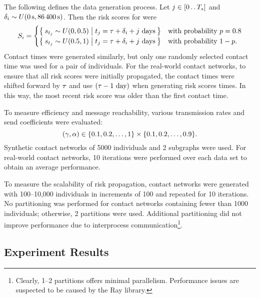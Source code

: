 The following defines the data generation process. Let $j \in [0 \mathinner {\ldotp \ldotp} T_s]$ and $\delta_i \sim U(\qty{0}{\second}, \qty{86400}{\second})$. Then the risk scores for  were
\begin{equation*}
  S_i = 
    \begin{cases}
      \Set{ s_{t_j} \sim U(0, 0.5) |  t_j = \tau+ \delta_i + j \text{ days}} & \text{with probability } p = 0.8 \\
      \Set{ s_{t_j} \sim U(0.5, 1) | t_j = \tau+ \delta_i + j \text{ days}} & \text{with probability } 1 - p.
    \end{cases}
\end{equation*}
Contact times were generated similarly, but only one randomly selected contact time was used for a pair of individuals. For the real-world contact networks, to ensure that all risk scores were initially propagated, the contact times were shifted forward by $\tau$ and use $(\tau - 1 \text{ day})$ when generating risk scores times. In this way, the most recent risk score was older than the first contact time.

To measure efficiency and message reachability, various transmission rates and send coefficients were evaluated:
\begin{equation*}
  (\gamma, \alpha) \in \{0.1, 0.2, \ldots, 1\} \times \{0.1, 0.2, \ldots, 0.9\}.
\end{equation*}
Synthetic contact networks of \num{5000} individuals and \num{2} subgraphs were used. For real-world contact networks, \num{10} iterations were performed over each data set to obtain an average performance.

To measure the scalability of risk propagation, contact networks were generated with 100--10,000 individuals in increments of \num{100} and repeated for \num{10} iterations. No partitioning was performed for contact networks containing fewer than \num{1000} individuals; otherwise, \num{2} partitions were used. Additional partitioning did not improve performance due to interprocess communication\footnote{Clearly, 1--2 partitions offers minimal parallelism. Performance issues are suspected to be caused by the Ray library.}.

\subsection{Experiment Results}

